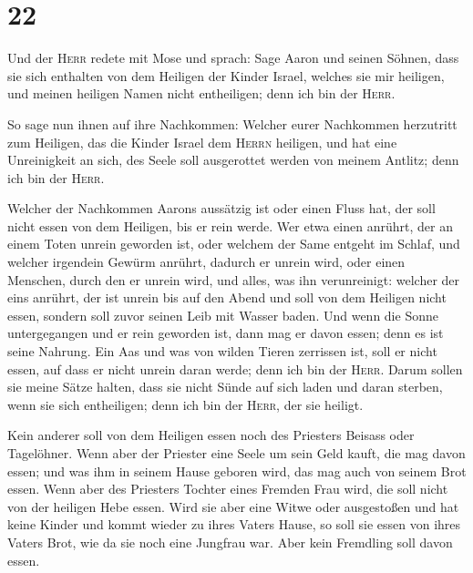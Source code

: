 \hypertarget{section-21}{%
\section{22}\label{section-21}}

 Und der \textsc{Herr} redete mit Mose und sprach:
 Sage Aaron und seinen Söhnen, dass sie sich enthalten von
dem Heiligen der Kinder Israel, welches sie mir heiligen, und meinen
heiligen Namen nicht entheiligen; denn ich bin der \textsc{Herr}.

 So sage nun ihnen auf ihre Nachkommen: Welcher eurer
Nachkommen herzutritt zum Heiligen, das die Kinder Israel dem
\textsc{Herrn} heiligen, und hat eine Unreinigkeit an sich, des Seele
soll ausgerottet werden von meinem Antlitz; denn ich bin der
\textsc{Herr}.

 Welcher der Nachkommen Aarons aussätzig ist oder einen
Fluss hat, der soll nicht essen von dem Heiligen, bis er rein werde. Wer
etwa einen anrührt, der an einem Toten unrein geworden ist, oder welchem
der Same entgeht im Schlaf,  und welcher irgendein Gewürm
anrührt, dadurch er unrein wird, oder einen Menschen, durch den er
unrein wird, und alles, was ihn verunreinigt:  welcher der
eins anrührt, der ist unrein bis auf den Abend und soll von dem Heiligen
nicht essen, sondern soll zuvor seinen Leib mit Wasser baden.
 Und wenn die Sonne untergegangen und er rein geworden
ist, dann mag er davon essen; denn es ist seine Nahrung. 
Ein Aas und was von wilden Tieren zerrissen ist, soll er nicht essen,
auf dass er nicht unrein daran werde; denn ich bin der \textsc{Herr}.
 Darum sollen sie meine Sätze halten, dass sie nicht Sünde
auf sich laden und daran sterben, wenn sie sich entheiligen; denn ich
bin der \textsc{Herr}, der sie heiligt.

 Kein anderer soll von dem Heiligen essen noch des
Priesters Beisass oder Tagelöhner.  Wenn aber der
Priester eine Seele um sein Geld kauft, die mag davon essen; und was ihm
in seinem Hause geboren wird, das mag auch von seinem Brot essen.
 Wenn aber des Priesters Tochter eines Fremden Frau wird,
die soll nicht von der heiligen Hebe essen.  Wird sie
aber eine Witwe oder ausgestoßen und hat keine Kinder und kommt wieder
zu ihres Vaters Hause, so soll sie essen von ihres Vaters Brot, wie da
sie noch eine Jungfrau war. Aber kein Fremdling soll davon essen.


